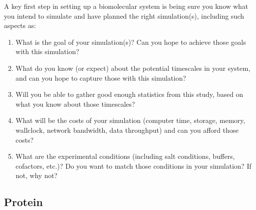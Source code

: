 \documentclass[9pt]{livecoms}
\begin{document}
{A key first step in setting up a biomolecular system is being sure you know what you intend to simulate and have planned the right simulation(s), including such aspects as:
\begin{enumerate}
\item What is the goal of your simulation(s)? Can you hope to achieve those goals with this simulation?
\item What do you know (or expect) about the potential timescales in your system, and can you hope to capture those with this simulation?
\item Will you be able to gather good enough statistics from this study, based on what you know about those timescales?
\item What will be the costs of your simulation (computer time, storage, memory, wallclock, network bandwidth, data throughput) and can you afford those costs? 
\item What are the experimental conditions (including salt conditions, buffers, cofactors, etc.)? Do you want to match those conditions in your simulation? If not, why not?
\end{enumerate}


\subsection{Protein} 

}
\end{document}
